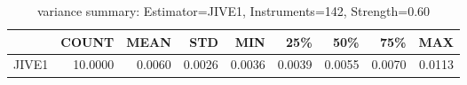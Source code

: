\begin{table}[ht]
\centering
\caption{variance summary: Estimator=JIVE1, Instruments=142, Strength=0.60}
\begin{tabular}{lrrrrrrrr}
\toprule
 & COUNT & MEAN & STD & MIN & 25\% & 50\% & 75\% & MAX \\
\midrule
JIVE1 & 10.0000 & 0.0060 & 0.0026 & 0.0036 & 0.0039 & 0.0055 & 0.0070 & 0.0113 \\
\bottomrule
\end{tabular}
\end{table}
